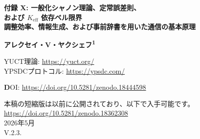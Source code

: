 \documentclass[12pt,a4paper]{article}
\theoremstyle{definition}
\theoremstyle{remark}
\begin{document}
	
	\begin{titlepage}
		\begin{center}
			\vspace*{1cm}
			
			\Huge\textbf{付録 X: 一般化シャノン理論、定常誤差則、\\および \(K_{\mathrm{eff}}\) 依存ベル限界} \\
			\vspace{0.5cm}
			\Large\textbf{調整効率、情報生成、および事前辞書を用いた通信の基本原理}
			
			\vspace{1.5cm}
			
			\Large\textbf{アレクセイ・V・ヤクシェフ\textsuperscript{1}}
			
			YUCT理論: \url{https://yuct.org/}\\
			YPSDCプロトコル: \url{https://ypsdc.com/}\\
			
			\vspace{2cm}
			
			\textbf DOI: \url{https://doi.org/10.5281/zenodo.18444598}\\
			
			\vspace{1cm}
			
			\vspace{0cm}
			\large 
			本稿の短縮版は以前に公開されており、以下で入手可能です。\\
			\url{https://doi.org/10.5281/zenodo.18362308}\\
			\vspace{1cm}
			2026年5月 \\ \large V.2.3.
			
			\vspace{2cm}
			

\end{center}
\end{titlepage}
\end{document}
